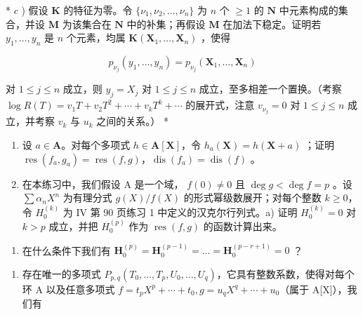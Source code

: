 * \(c\) ) 假设 \(\mathbf{K}\) 的特征为零。令 \(\{\nu_1,\nu_2,\dots,\nu_n\}\) 为 \(n\) 个 \(\geqslant 1\) 的 \(\mathbf{N}\) 中元素构成的集合，并设 \(\mathbf{M}\) 为该集合在 \(\mathbf{N}\) 中的补集；再假设 \(\mathbf{M}\) 在加法下稳定。证明若 \(y_{1},\ldots ,y_{n}\) 是 \(n\) 个元素，均属 \(\mathbf{K}(\mathbf{X}_1,\dots,\mathbf{X}_n)\) ，使得

\[
p _ {\nu _ {j}} (y _ {1}, \dots , y _ {n}) = p _ {\nu _ {j}} (\mathbf {X} _ {1}, \dots , \mathbf {X} _ {n})
\]

对 \(1 \leqslant j \leqslant n\) 成立，则 \(y_{j} = X_{j}\) 对 \(1 \leqslant j \leqslant n\) 成立，至多相差一个置换。（考察 \(\log R(T) = v_{1}T + v_{2}T^{2} + \cdots + v_{k}T^{k} + \cdots\) 的展开式，注意 \(v_{\nu_{j}} = 0\) 对 \(1 \leqslant j \leqslant n\) 成立，并考察 \(v_{k}\) 与 \(u_{k}\) 之间的关系。） *

\begin{enumerate}
\def\labelenumi{\arabic{enumi})}
\setcounter{enumi}{9}
\item
  设 \(a \in \mathbf{A}\)。对每个多项式 \(h \in \mathbf{A}[\mathbf{X}]\)，令 \(h_a(\mathbf{X}) = h(\mathbf{X} + a)\) ；证明 \(\operatorname{res}(f_a, g_a) = \operatorname{res}(f, g)\)，\(\operatorname{dis}(f_a) = \operatorname{dis}(f)\) 。
\item
  在本练习中，我们假设 A 是一个域， \(f(0) \neq 0\) 且 \(\deg g < \deg f = p\) 。设 \(\sum \alpha_{n} X^{n}\) 为有理分式 \(g(X) / f(X)\) 的形式幂级数展开；对每个整数 \(k \geqslant 0\)，令 \(H_{0}^{(k)}\) 为 IV 第 90 页练习 1 中定义的汉克尔行列式。a) 证明 \(H_{0}^{(k)} = 0\) 对 \(k > p\) 成立，并把 \(H_{0}^{(p)}\) 作为 \(\operatorname{res}(f, g)\) 的函数计算出来。
\end{enumerate}

\begin{enumerate}
\def\labelenumi{\alph{enumi})}
\setcounter{enumi}{1}
\tightlist
\item
  在什么条件下我们有 \(\mathbf{H}_0^{(p)} = \mathbf{H}_0^{(p - 1)} = \ldots = \mathbf{H}_0^{(p - r + 1)} = 0\) ？
\end{enumerate}

\begin{enumerate}
\def\labelenumi{\arabic{enumi})}
\setcounter{enumi}{11}
\tightlist
\item
  存在唯一的多项式 \(P_{p,q}(T_{0},\ldots,T_{p},U_{0},\ldots,U_{q})\)，它具有整数系数，使得对每个环 A 以及任意多项式 \(f=t_{p}X^{p}+\cdots+t_{0}, g=u_{q}X^{q}+\cdots+u_{0}\)（属于 A{[}X{]}），我们有
\end{enumerate}


